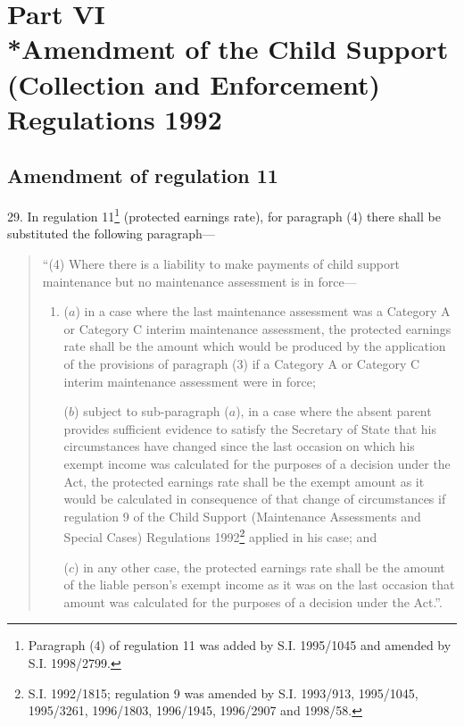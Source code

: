 \documentclass[12pt,a4paper]{article}
\begin{document}
\section[Part VI --- Amendment of the Child Support (Collection and Enforcement) Regulations 1992]{Part VI\\*Amendment of the Child Support (Collection and Enforcement) Regulations 1992}

\renewcommand\parthead{--- Part VI}

\subsection[29. Amendment of regulation 11]{Amendment of regulation 11}

29.  In regulation 11\footnote{\frenchspacing Paragraph (4) of regulation 11 was added by S.I. 1995/1045 and amended by S.I. 1998/2799.} (protected earnings rate), for paragraph (4) there shall be substituted the following paragraph—
\begin{quotation}
“(4) Where there is a liability to make payments of child support maintenance but no maintenance assessment is in force—
\begin{enumerate}\item[]
($a$) in a case where the last maintenance assessment was a Category A or Category C interim maintenance assessment, the protected earnings rate shall be the amount which would be produced by the application of the provisions of paragraph (3) if a Category A or Category C interim maintenance assessment were in force;

($b$) subject to sub-paragraph ($a$), in a case where the absent parent provides sufficient evidence to satisfy the Secretary of State that his circumstances have changed since the last occasion on which his exempt income was calculated for the purposes of a decision under the Act, the protected earnings rate shall be the exempt amount as it would be calculated in consequence of that change of circumstances if regulation 9 of the Child Support (Maintenance Assessments and Special Cases) Regulations 1992\footnote{\frenchspacing S.I. 1992/1815; regulation 9 was amended by S.I. 1993/913, 1995/1045, 1995/3261, 1996/1803, 1996/1945, 1996/2907 and 1998/58.} applied in his case; and

($c$) in any other case, the protected earnings rate shall be the amount of the liable person’s exempt income as it was on the last occasion that amount was calculated for the purposes of a decision under the Act.”.
\end{enumerate}
\end{quotation}
\end{document}
